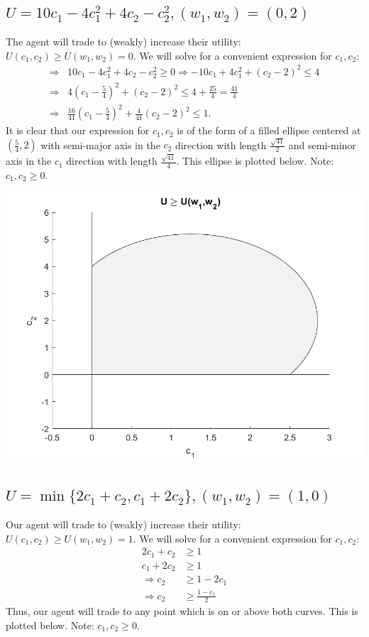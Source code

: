 \documentclass[11pt]{article} %
\begin{document}
\subsection{$U = 10 c_1 - 4 c_{1}^2 + 4c_2 - c_{2}^2, (w_1,w_2) = (0,2)$}
The agent will trade to (weakly) increase their utility: $U(c_1,c_2)\geq U(w_1,w_2) = 0.$ We will solve for a convenient expression for $c_1,c_2$:
\begin{align*}
\Rightarrow& 10 c_1 - 4 c_{1}^2 + 4c_2 - c_{2}^2 \geq 0 \Rightarrow -10 c_1 + 4 c_{1}^2 + (c_2 - 2)^2 \leq 4 \\
\Rightarrow& 4(c_1 - \frac{5}{4})^2 +  (c_2 - 2)^2 \leq 4 + \frac{25}{4} = \frac{41}{4} \\
\Rightarrow& \frac{16}{41}(c_1 - \frac{5}{4})^2 +  \frac{4}{41}(c_2 - 2)^2 \leq 1.
\end{align*}
It is clear that our expression for $c_1,c_2$ is of the form of a filled ellipse centered at $(\frac{5}{4},2)$ with semi-major axis in the $c_2$ direction with length $\frac{\sqrt{41}}{2}$ and semi-minor axis in the $c_1$ direction with length $\frac{\sqrt{41}}{4}.$ This ellipse is plotted below. Note: $c_1,c_2\geq 0.$

\includegraphics{p1}

\subsection{$U = \min \{ 2c_1 + c_2, c_1 + 2 c_2\}, (w_1,w_2) = (1,0)$}
Our agent will trade to (weakly) increase their utility: $U(c_1,c_2)\geq U(w_1,w_2) = 1$. We will solve for a convenient expression for $c_1,c_2$:
\begin{align*}
2c_1 + c_2 &\geq 1 \\
c_1 + 2c_2 &\geq 1 \\
\Rightarrow  c_2&\geq 1 - 2c_1 \\
\Rightarrow c_2&\geq \frac{1-c_1}{2}
\end{align*}
Thus, our agent will trade to any point which is on or above both curves. This is plotted below. Note: $c_1,c_2\geq 0.$
\end{document}
